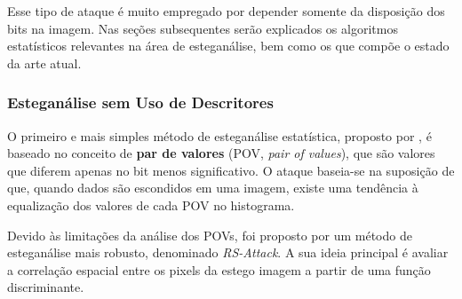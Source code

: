 Esse tipo de ataque é muito empregado por depender somente da disposição dos bits na imagem. Nas seções subsequentes serão explicados os algoritmos estatísticos relevantes na área de esteganálise, bem como os que compõe o estado da arte atual. 

\subsubsection{Esteganálise sem Uso de Descritores}
\label{subsec:esteganalise-sem-descr}

O primeiro e mais simples método de esteganálise estatística, proposto por , é baseado no conceito de \textbf{par de valores} (POV, \textit{pair of values}), que são valores que diferem apenas no bit menos significativo. O ataque baseia-se na suposição de que, quando dados são escondidos em uma imagem, existe uma tendência à equalização dos valores de cada POV no histograma.



Devido às limitações da análise dos POVs, foi proposto por  um método de esteganálise mais robusto, denominado \textit{RS-Attack}. A sua ideia principal é avaliar a correlação espacial entre os pixels da estego imagem a partir de uma função discriminante. %

